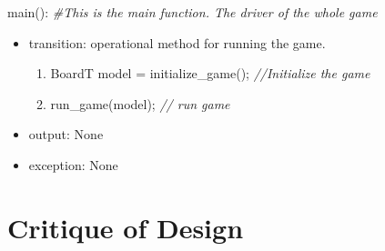 \documentclass[12pt]{article}
\begin{document}
\noindent main(): \textit{\#This is the main function. The driver of the whole game}
\begin{itemize}
  \item transition: operational method for running the game.
  \begin{enumerate}
  \item BoardT model = initialize\_game(); \textit{ //Initialize the game}
  \item run\_game(model); \textit{ // run game}
  \end{enumerate}
  \item output: None
  \item exception: None
\end{itemize}
\newpage

\section{Critique of Design}
\end{document}

